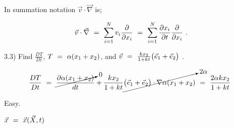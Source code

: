 \documentclass{article}
\newcounter{subsubsubsection}[subsubsection]
\begin{document}
In summation notation \begin{math} \vec{v}\cdot\vec{\nabla} \end{math} is;

\begin{equation} \label{eq:1}
\vec{v}\cdot\vec{\nabla} \hspace{0.125cm} = \hspace{0.125cm} \sum_{i=1}^{N} v_i \frac{\partial}{\partial{x}_i} \hspace{0.125cm} = \hspace{0.125cm} \sum_{i=1}^{N} \frac{\partial{x_i}}{\partial{t}} \frac{\partial}{\partial{x}_i} \hspace{0.125cm} .
\end{equation}


3.3) Find \begin{math} \frac{D T}{D t} \end{math}, \begin{math} T \hspace{0.125cm} = \hspace{0.125cm} \alpha ( x_1 + x_2 ) \end{math}, and \begin{math} \vec{v} \hspace{0.125cm} = \hspace{0.125cm} \frac{k x_2}{1 + k t} \big( \vec{e}_1 + \vec{e}_2 \big) \hspace{0.125cm} \end{math}.

\begin{equation} \label{eq:1}
\frac{D T}{D t} \hspace{0.125cm} = \hspace{0.125cm} \cancelto{0}{\frac{\partial{\alpha ( x_1 + x_2 )}}{dt}} + \frac{k x_2}{1 + k t} \cancelto{2 \alpha}{\big( \vec{e}_1 + \vec{e}_2 \big) \cdot \nabla{\alpha ( x_1 + x_2 )}} \hspace{0.125cm} = \hspace{0.125cm} \frac{2 \alpha k x_2}{1 + kt} \hspace{0.125cm} \end{equation}

Easy.


\begin{math} \vec{x} \hspace{0.125cm} = \hspace{0.125cm} \vec{x}( \vec{X} , t ) \end{math} 
\end{document}
